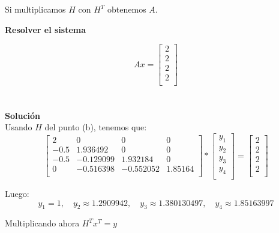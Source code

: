     Si multiplicamos $H$ con $H^T$ obtenemos $A$.
 
    \textbf{Resolver el sistema}
    
    \[
        Ax = \begin{bmatrix}
            2\\
            2\\
            2\\
            2\\
        \end{bmatrix}
    \]
    \\\\
    
    \textbf{Solución}\\
    
    Usando $H$ del punto (b), tenemos que:
    \[
        \begin{bmatrix}
            2 & 0 & 0 & 0\\
            -0.5 & 1.936492 & 0 & 0\\
            -0.5 & -0.129099 & 1.932184 & 0 \\
            0 & -0.516398 & -0.552052 & 1.85164\\
        \end{bmatrix} * 
        \begin{bmatrix}
            y_1\\ y_2\\ y_3\\ y_4\\
        \end{bmatrix} = 
        \begin{bmatrix}
            2 \\ 2 \\ 2 \\ 2 \\
        \end{bmatrix}
    \]
    
    Luego:
    $$
    y_1 = 1, \quad y_2 \approx 1.2909942, \quad y_3 \approx 1.380130497, \quad y_4 \approx 1.85163997
    $$
    
    Multiplicando ahora $H^T x^T = y$
    
